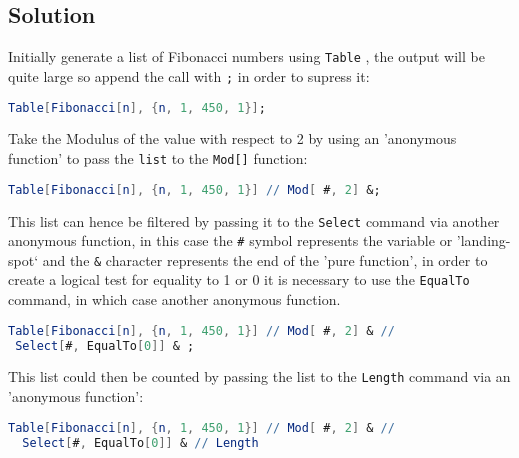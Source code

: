 \documentclass[12pt]{article}
\newenvironment{sol}[1][Problem]{%
	\proof[\nopunct]  %
}{\endproof}
\begin{document}
\begin{sol}


\subsection{Solution}

Initially generate a list of Fibonacci numbers using \verb|Table| , the output will be quite large so append the call with \verb|;| in order to supress it:

\begin{lstlisting}[language = Mathematica]
Table[Fibonacci[n], {n, 1, 450, 1}];
\end{lstlisting}	

Take the Modulus of the value with respect to 2 by using an 'anonymous function' to pass the \verb|list|  to the \verb|Mod[]| function:

\begin{lstlisting}[language = Mathematica]
Table[Fibonacci[n], {n, 1, 450, 1}] // Mod[ #, 2] &;
\end{lstlisting}	



This list can hence be filtered by passing it to the \verb|Select| command via another anonymous function, in this case the \verb|#|  symbol represents the variable or 'landing-spot` and the \verb|&| character represents the end of the 'pure function', in order to create a logical test for equality to 1 or 0 it is necessary to use the \verb|EqualTo| command, in which case another anonymous function.

\begin{lstlisting}[language = Mathematica]
Table[Fibonacci[n], {n, 1, 450, 1}] // Mod[ #, 2] & // 
 Select[#, EqualTo[0]] & ;
\end{lstlisting}	

\newpage

This list could then be counted by passing the list to the \verb|Length| command via an 'anonymous function':

\begin{lstlisting}[language = Mathematica]
Table[Fibonacci[n], {n, 1, 450, 1}] // Mod[ #, 2] & // 
  Select[#, EqualTo[0]] & // Length
\end{lstlisting}	


\end{sol}
\end{document}
